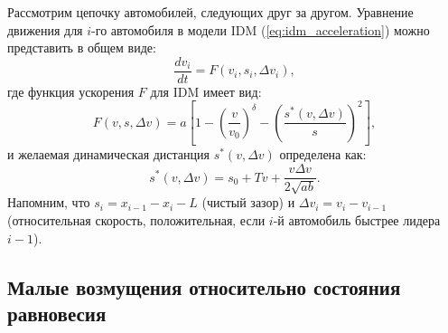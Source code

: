 \documentclass[12pt, a4paper]{article}
\begin{document}
Рассмотрим цепочку автомобилей, следующих друг за другом. Уравнение движения для $i$-го автомобиля в модели IDM (\ref{eq:idm_acceleration}) можно представить в общем виде:
\begin{equation}
\label{eq:general_acceleration_f}
\frac{dv_i}{dt} = F(v_i, s_i, \Delta v_i),
\end{equation}
где функция ускорения $F$ для IDM имеет вид:
\begin{equation}
\label{eq:F_idm_definition}
F(v, s, \Delta v) = a \left[1 - \left(\frac{v}{v_0}\right)^\delta - \left( \frac{s^*(v, \Delta v)}{s} \right)^2 \right],
\end{equation}
и желаемая динамическая дистанция $s^*(v, \Delta v)$ определена как:
\begin{equation}
\label{eq:s_star_reminder}
s^*(v, \Delta v) = s_0 + T v + \frac{v \Delta v}{2 \sqrt{ab}}.
\end{equation}
Напомним, что $s_i = x_{i-1} - x_i - L$ (чистый зазор) и $\Delta v_i = v_i - v_{i-1}$ (относительная скорость, положительная, если $i$-й автомобиль быстрее лидера $i-1$).

\subsection{Малые возмущения относительно состояния равновесия}
\label{subsec:small_perturbations}
\end{document}
